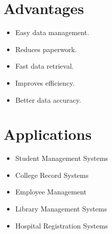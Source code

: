 \documentclass[12pt,a4paper]{report}
\begin{document}









\section{Advantages}

\begin{itemize}

\item Easy data management.

\item Reduces paperwork.

\item Fast data retrieval.

\item Improves efficiency.

\item Better data accuracy.

\end{itemize}


\section{Applications}

\begin{itemize}

\item Student Management Systems

\item College Record Systems

\item Employee Management

\item Library Management Systems

\item Hospital Registration Systems

\end{itemize}
\end{document}
